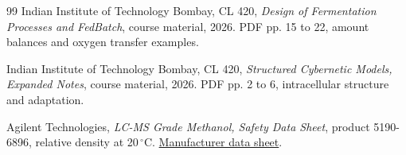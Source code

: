 \documentclass[12pt,a4paper]{article}
\begin{document}
\begin{thebibliography}{99}
Indian Institute of Technology Bombay, CL 420, \textit{Design of Fermentation Processes and FedBatch}, course material, 2026. PDF pp. 15 to 22, amount balances and oxygen transfer examples.

Indian Institute of Technology Bombay, CL 420, \textit{Structured Cybernetic Models, Expanded Notes}, course material, 2026. PDF pp. 2 to 6, intracellular structure and adaptation.

Agilent Technologies, \textit{LC-MS Grade Methanol, Safety Data Sheet}, product 5190-6896, relative density at 20\,$^{\circ}$C. \href{https://www.agilent.com/cs/library/msds/5190-6896_UKEnglish.pdf}{Manufacturer data sheet}.
\end{thebibliography}
\endgroup
\end{document}
